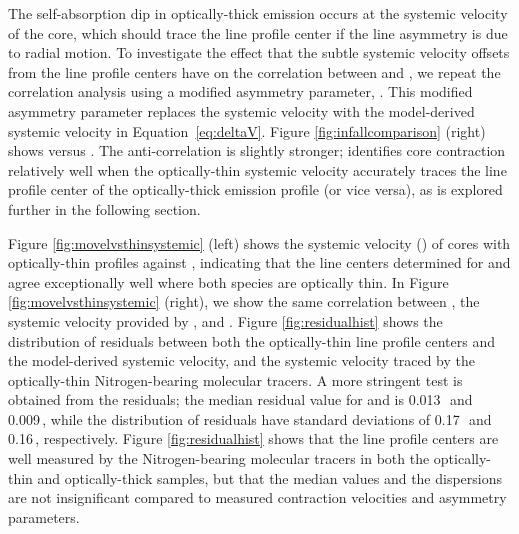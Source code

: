\documentclass[iop,twocolappendix]{emulateapj}
\begin{document}
The self-absorption dip in optically-thick emission occurs at the systemic velocity of the core, which should trace the line profile center if the line asymmetry is due to radial motion. To investigate the effect that the subtle systemic velocity offsets from the {\HCO} line profile centers have on the correlation between {\deltaV} and {\Vin}, we repeat the correlation analysis using a modified asymmetry parameter, {\deltaVstar}. This modified asymmetry parameter replaces the systemic velocity {\Vthin} with the {\Hill} model-derived systemic velocity {\Vmod} in Equation~\ref{eq:deltaV}. Figure \ref{fig:infallcomparison} (right) shows {\Vin} versus {\deltaVstar}. The anti-correlation is slightly stronger; {\deltaV} identifies core contraction relatively well when the optically-thin systemic velocity accurately traces the line profile center of the optically-thick emission profile (or vice versa), as is explored further in the following section. 

 Figure \ref{fig:movelvsthinsystemic} (left) shows the systemic velocity ({\Vcent}) of cores with optically-thin {\HCO} profiles against {\Vthin}, indicating that the line centers determined for {\HCO} and {\NtD} agree exceptionally well where both species are optically thin. In Figure \ref{fig:movelvsthinsystemic} (right), we show the same correlation between {\Vmod}, the systemic velocity provided by {\Hill}, and {\Vthin}. Figure \ref{fig:residualhist} shows the distribution of residuals between both the optically-thin {\HCO} line profile centers and the model-derived systemic velocity, and the systemic velocity traced by the optically-thin Nitrogen-bearing molecular tracers. A more stringent test is obtained from the residuals; the median residual value for {\Vcent} and {\Vmod} is 0.013\,\kms\ and 0.009\,\kms, while the distribution of residuals have standard deviations of 0.17\,\kms\ and 0.16\,\kms, respectively. Figure \ref{fig:residualhist} shows that the line profile centers are well measured by the Nitrogen-bearing molecular tracers in both the optically-thin and optically-thick {\HCO} samples, but that the median values and the dispersions are not insignificant compared to measured contraction velocities and asymmetry parameters.
\end{document}
